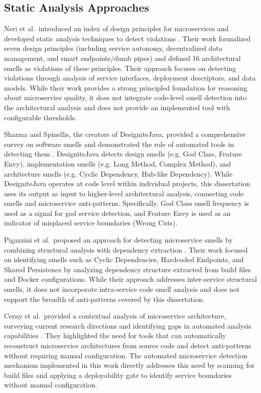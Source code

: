 \subsection{Static Analysis Approaches}
\label{subsec:related-static}

\par Neri et al.\ introduced an index of design principles for microservices and developed static analysis techniques to detect violations \cite{Neri2020}. Their work formalized seven design principles (including service autonomy, decentralized data management, and smart endpoints/dumb pipes) and defined 16 architectural smells as violations of these principles. Their approach focuses on detecting violations through analysis of service interfaces, deployment descriptors, and data models. While their work provides a strong principled foundation for reasoning about microservice quality, it does not integrate code-level smell detection into the architectural analysis and does not provide an implemented tool with configurable thresholds.

Sharma and Spinellis, the creators of DesigniteJava, provided a comprehensive survey on software smells and demonstrated the role of automated tools in detecting them \cite{Sharma2018}. DesigniteJava detects design smells (e.g. God Class, Feature Envy), implementation smells (e.g. Long Method, Complex Method), and architecture smells (e.g. Cyclic Dependency, Hub-like Dependency). While DesigniteJava operates at code level within individual projects, this dissertation uses its output as input to higher-level architectural analysis, connecting code smells and microservice anti-patterns. Specifically, God Class smell frequency is used as a signal for god service detection, and Feature Envy is used as an indicator of misplaced service boundaries (Wrong Cuts).

Pigazzini et al.\ proposed an approach for detecting microservice smells by combining structural analysis with dependency extraction \cite{Pigazzini2020}. Their work focused on identifying smells such as Cyclic Dependencies, Hardcoded Endpoints, and Shared Persistence by analyzing dependency structure extracted from build files and Docker configurations. While their approach addresses inter-service structural smells, it does not incorporate intra-service code smell analysis and does not support the breadth of anti-patterns covered by this dissertation.

Cerny et al.\ provided a contextual analysis of microservice architecture, surveying current research directions and identifying gaps in automated analysis capabilities \cite{Cerny2018}. They highlighted the need for tools that can automatically reconstruct microservice architectures from source code and detect anti-patterns without requiring manual configuration. The automated microservice detection mechanism implemented in this work directly addresses this need by scanning for build files and applying a deployability gate to identify service boundaries without manual configuration.

